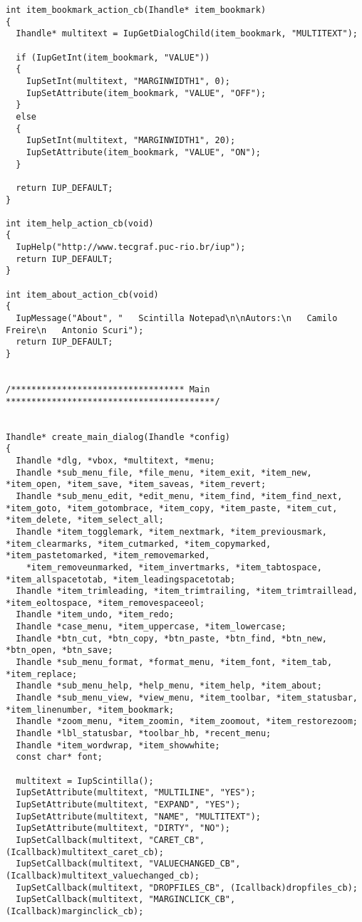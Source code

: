 \documentclass{ctexart}
\begin{document}
\begin{lstlisting}
int item_bookmark_action_cb(Ihandle* item_bookmark)
{
  Ihandle* multitext = IupGetDialogChild(item_bookmark, "MULTITEXT");

  if (IupGetInt(item_bookmark, "VALUE"))
  {
    IupSetInt(multitext, "MARGINWIDTH1", 0);
    IupSetAttribute(item_bookmark, "VALUE", "OFF");
  }
  else
  {
    IupSetInt(multitext, "MARGINWIDTH1", 20);
    IupSetAttribute(item_bookmark, "VALUE", "ON");
  }

  return IUP_DEFAULT;
}

int item_help_action_cb(void)
{
  IupHelp("http://www.tecgraf.puc-rio.br/iup");
  return IUP_DEFAULT;
}

int item_about_action_cb(void)
{
  IupMessage("About", "   Scintilla Notepad\n\nAutors:\n   Camilo Freire\n   Antonio Scuri");
  return IUP_DEFAULT;
}


/********************************** Main *****************************************/


Ihandle* create_main_dialog(Ihandle *config)
{
  Ihandle *dlg, *vbox, *multitext, *menu;
  Ihandle *sub_menu_file, *file_menu, *item_exit, *item_new, *item_open, *item_save, *item_saveas, *item_revert;
  Ihandle *sub_menu_edit, *edit_menu, *item_find, *item_find_next, *item_goto, *item_gotombrace, *item_copy, *item_paste, *item_cut, *item_delete, *item_select_all;
  Ihandle *item_togglemark, *item_nextmark, *item_previousmark, *item_clearmarks, *item_cutmarked, *item_copymarked, *item_pastetomarked, *item_removemarked,
    *item_removeunmarked, *item_invertmarks, *item_tabtospace, *item_allspacetotab, *item_leadingspacetotab;
  Ihandle *item_trimleading, *item_trimtrailing, *item_trimtraillead, *item_eoltospace, *item_removespaceeol;
  Ihandle *item_undo, *item_redo;
  Ihandle *case_menu, *item_uppercase, *item_lowercase;
  Ihandle *btn_cut, *btn_copy, *btn_paste, *btn_find, *btn_new, *btn_open, *btn_save;
  Ihandle *sub_menu_format, *format_menu, *item_font, *item_tab, *item_replace;
  Ihandle *sub_menu_help, *help_menu, *item_help, *item_about;
  Ihandle *sub_menu_view, *view_menu, *item_toolbar, *item_statusbar, *item_linenumber, *item_bookmark;
  Ihandle *zoom_menu, *item_zoomin, *item_zoomout, *item_restorezoom;
  Ihandle *lbl_statusbar, *toolbar_hb, *recent_menu;
  Ihandle *item_wordwrap, *item_showwhite;
  const char* font;

  multitext = IupScintilla();
  IupSetAttribute(multitext, "MULTILINE", "YES");
  IupSetAttribute(multitext, "EXPAND", "YES");
  IupSetAttribute(multitext, "NAME", "MULTITEXT");
  IupSetAttribute(multitext, "DIRTY", "NO");
  IupSetCallback(multitext, "CARET_CB", (Icallback)multitext_caret_cb);
  IupSetCallback(multitext, "VALUECHANGED_CB", (Icallback)multitext_valuechanged_cb);
  IupSetCallback(multitext, "DROPFILES_CB", (Icallback)dropfiles_cb);
  IupSetCallback(multitext, "MARGINCLICK_CB", (Icallback)marginclick_cb);


\end{lstlisting}
\end{document}
